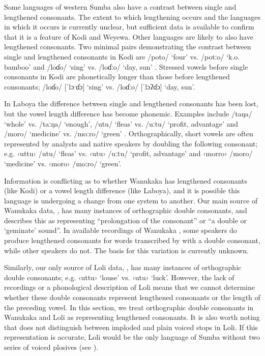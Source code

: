 Some languages of western Sumba also have a contrast between
single and lengthened consonants.
The extent to which lengthening occurs
and the languages in which it occurs is currently unclear,
but sufficient data is available to confirm that it is a feature
of Kodi and Weyewa.
Other languages are likely to also have lengthened consonants.
Two minimal pairs demonstrating the contrast between single
and lengthened consonants in Kodi are /poto/ ‘four’ vs. /potːo/ ‘k.o.
bamboo’ and /loɗo/ ‘sing’ vs.
/loɗːo/ ‘day, sun’ \citep[36]{Lovestrand2021}.
Stressed vowels before single consonants in Kodi are phonetically
longer than those before lengthened consonants; /loɗo/ [ˈlɔˑɗɔ] ‘sing’ vs.
/loɗːo/ [ˈlɔʔɗɔ] ‘day, sun’.

In Laboya the difference between single
and lengthened consonants has been lost,
but the vowel length difference has become phonemic.
Examples include /taŋa/ ‘whole’ vs.
/taːŋa/ ‘enough’, /utu/ ‘fleas’ vs.
/uːtu/ ‘profit, advantage’
and /moro/ ‘medicine’ vs. /moːro/ ‘green’ \citep[19]{Verdizade2019a}.
Orthographically, short vowels are often represented by analysts
and native speakers by doubling the following consonant; e.g.
‹uttu› /utu/ ‘fleas’ vs.
‹utu› \mbox{/uːtu/} ‘profit, advantage’
and ‹morro› /moro/ ‘medicine’ vs. ‹moro› /moːro/ ‘green’.

Information is conflicting as to whether Wanukaka has lengthened
consonants (like Kodi) or a vowel length difference (like Laboya),
and it is possible this language is undergoing a change from
one system to another.
Our main source of Wanukaka data,
\citet{Mitchell2008a}, has many instances of orthographic double
consonants, and \citet{MitchellND} describes this as representing “prolongation
of the consonant” or “a double or ‘geminate’ sound”.
In available recordings of Wanukaka \citep{LovestrandBalle2018},
some speakers do produce lengthened consonants
for words transcribed by \citet{Mitchell2008a} with a double
consonant, while other speakers do not.
The basis for this variation is currently unknown.

Similarly, our only source of Loli data,
\citet{Mitchell2008b}, has many instances of orthographic double consonants; e.g.
‹uttu› ‘louse’ vs. ‹utu› ‘luck’.
However, the lack of recordings or a phonological description
of Loli means that we cannot determine whether these double consonants
represent lengthened consonants or the length of the preceding vowel.
In this section, we treat orthographic double consonants in Wanukaka
and Loli as representing lengthened consonants.
It is also worth noting that \citet{Mitchell2008b} does not distinguish
between imploded and plain voiced stops in Loli.
If this representation is accurate,
Loli would be the only language of Sumba without two series of
voiced plosives (see ).